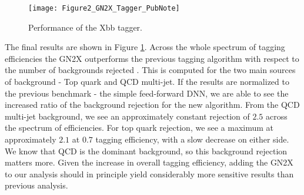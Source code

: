 \documentclass[12pt]{article}
\begin{document}

\begin{figure}[t!]
    \centering
    \texttt{[image: Figure2\_GN2X\_Tagger\_PubNote]}
    \caption{Performance of the Xbb tagger.}
    \label{fig:Xbb_tagger}
\end{figure}

The final results are shown in Figure \ref{fig:Xbb_tagger}. Across the whole
spectrum of tagging efficiencies the GN2X outperforms the previous tagging
algorithm with respect to the number of backgrounds rejected
\cite{boosted_hbbcc_tagger}. This is computed for the two main sources of
background - Top quark and QCD multi-jet. If the results are normalized to the
previous benchmark - the simple feed-forward DNN, we are able to see the
increased ratio of the background rejection for the new algorithm. From the QCD
multi-jet background, we see an approximately constant rejection of $2.5$ across
the spectrum of efficiencies. For top quark rejection, we see a maximum at
approximately $2.1$ at $0.7$ tagging efficiency, with a slow decrease on either
side. We know that QCD is the dominant background, so this background rejection
matters more. Given the increase in overall tagging efficiency, adding the GN2X
to our analysis should in principle yield considerably more sensitive results
than previous analysis.
\end{document}
